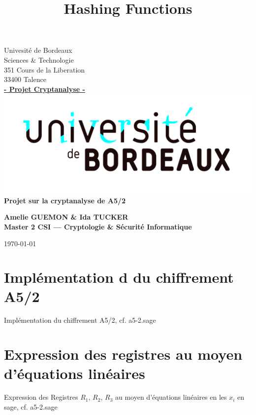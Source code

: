 \documentclass[a4paper]{article}
\title{Hashing Functions}
\author{}
\begin{document}
\begin{titlepage}
  \begin{sffamily}
  \begin{center}

    Univesité de Bordeaux\\ Sciences \& Technologie\\
           351 Cours de la Liberation\\33400 Talence\\[1em]
            \textbf{\underline{- Projet Cryptanalyse -}}\\[1.5cm]
           
    \includegraphics[scale=0.11]{UB.jpg}
    \\[3cm]

    { \huge \bfseries Projet sur la cryptanalyse de A5/2\\[0.5cm] }
    \begin{flushright}
      \bfseries {Amelie GUEMON \& Ida TUCKER\\[1em]Master 2 CSI --- Cryptologie \& Sécurité Informatique}\\[6.6cm]
    \end{flushright}
    
   
    \today

  \end{center}
  \end{sffamily}
\end{titlepage}

\section{Implémentation d du chiffrement A5/2 }
Implémentation du chiffrement A5/2, cf. a5-2.sage



\section{Expression des registres au moyen d'équations linéaires}
Expression des Registres $R_1$, $R_2$, $R_3$ au moyen d'équations linéaires en les $x_i$ en sage, cf. a5-2.sage
\end{document}
